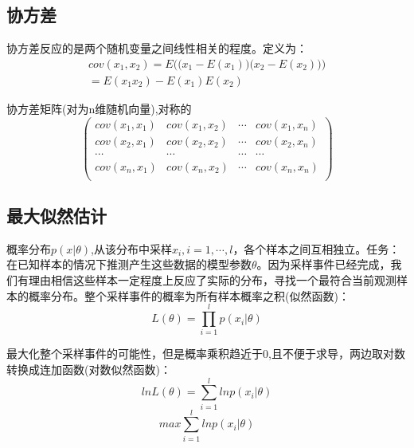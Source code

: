 \documentclass[UTF8]{ctexart} %
\begin{document}
		\subsection{协方差}
		协方差反应的是两个随机变量之间线性相关的程度。定义为：
		\[\begin{aligned}
			cov(x_1,x_2)= E\Big(\big(x_1-E(x_1)\big)\big(x_2-E(x_2)\big)\Big)\\
			=E(x_1x_2)-E(x_1)E(x_2)
		\end{aligned}\]
		
		协方差矩阵(对为n维随机向量),对称的
		\[\begin{pmatrix}
			cov(x_1,x_1)&cov(x_1,x_2)&\cdots&cov(x_1,x_n)\\
			cov(x_2,x_1)&cov(x_2,x_2)&\cdots&cov(x_2,x_n)\\
			\cdots&\cdots&\cdots&\cdots\\
			cov(x_n,x_1)&cov(x_n,x_2)&\cdots&cov(x_n,x_n)\\
		\end{pmatrix}\]
		
		\subsection{最大似然估计}
		概率分布$p(x|\theta)$,从该分布中采样$x_i,i=1,\cdots,l$，各个样本之间互相独立。任务：在已知样本的情况下推测产生这些数据的模型参数$\theta$。因为采样事件已经完成，我们有理由相信这些样本一定程度上反应了实际的分布，寻找一个最符合当前观测样本的概率分布。整个采样事件的概率为所有样本概率之积(似然函数)：
		\[L(\theta)=\prod_{i=1}^l p(x_i|\theta)\]
		
		最大化整个采样事件的可能性，但是概率乘积趋近于0,且不便于求导，两边取对数转换成连加函数(对数似然函数)：
		\[lnL(\theta) = \sum_{i=1}^l lnp(x_i|\theta)\]
		\[max \sum_{i=1}^l lnp(x_i|\theta)\]
		
		
		

	
		
		
	
	
\end{document}
